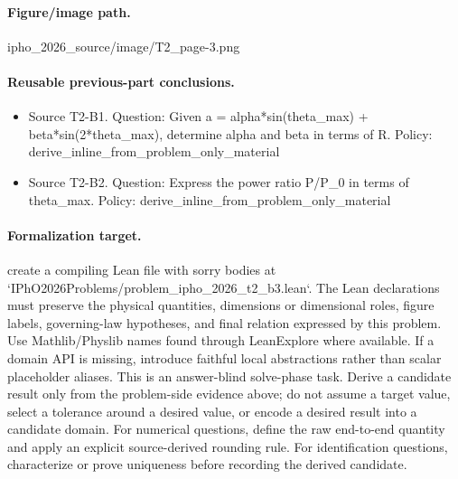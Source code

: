 \paragraph{Figure/image path.}
ipho\_2026\_source/image/T2\_page-3.png

\paragraph{Reusable previous-part conclusions.}
\begin{itemize}
\item Source T2-B1. Question: Given a = alpha*sin(theta\_max) + beta*sin(2*theta\_max), determine alpha and beta in terms of R. Policy: derive\_inline\_from\_problem\_only\_material
\item Source T2-B2. Question: Express the power ratio P/P\_0 in terms of theta\_max. Policy: derive\_inline\_from\_problem\_only\_material
\end{itemize}

\paragraph{Formalization target.}
create a compiling Lean file with sorry bodies at `IPhO2026Problems/problem\_ipho\_2026\_t2\_b3.lean`.
The Lean declarations must preserve the physical quantities, dimensions or dimensional roles, figure labels, governing-law hypotheses, and final relation expressed by this problem.
Use Mathlib/Physlib names found through LeanExplore where available. If a domain API is missing, introduce faithful local abstractions rather than scalar placeholder aliases.
This is an answer-blind solve-phase task. Derive a candidate result only from the problem-side evidence above; do not assume a target value, select a tolerance around a desired value, or encode a desired result into a candidate domain.
For numerical questions, define the raw end-to-end quantity and apply an explicit source-derived rounding rule. For identification questions, characterize or prove uniqueness before recording the derived candidate.

